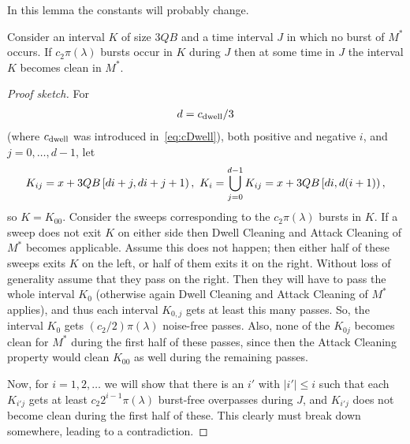 \documentclass[12pt]{memoir}
\renewcommand{\le}{\leq}
\def\B{B}
\newcommand{\Q}{Q}
\newcommand{\Cns}[2]{#1_{\textrm{\upshape #2}}}
\newcommand{\cns}[1]{\Cns{c}{#1}}
\newcommand{\cDwell}{\cns{dwell}}
\begin{document}
In this lemma the constants will probably change.
\begin{lemma}\label{lem:burst-density}
  Consider an interval \( K \) of size \( 3 \Q\B \) and a time interval \( J \) in which
no burst of \( M^{*} \) occurs.
If \( c_{2}\pi(\lambda) \) bursts occur in \( K \) during \( J \) then at some time in \( J \)
the interval \( K \) becomes clean in \( M^{*} \).
\end{lemma}
\begin{proof}[Proof sketch]
For 
\begin{align*}
 d=\cDwell/3
\end{align*}
(where \( \cDwell \) was introduced in~\eqref{eq:cDwell}),
both positive and negative \( i \), and \( j=0,\dots,d-1 \), let
\begin{align*}
   K_{ij}=x+3\Q\B\lint{d i+j}{d i+j+1},\ 
K_{i}=\bigcup_{j=0}^{d-1}K_{ij}=x+3\Q\B\lint{di}{d(i+1)},
 \end{align*}
so \( K=K_{00} \).
Consider the sweeps corresponding to the \( c_{2}\pi(\lambda) \) bursts in \( K \).
If a sweep does not exit \( K \) on either side then Dwell Cleaning and Attack Cleaning
of \( M^{*} \) becomes applicable.
Assume this does not happen; then
either half of these sweeps exits \( K \) on the left, or half of them exits it on the right.
Without loss of generality assume that they pass on the right.
Then they will have to pass the whole interval \( K_{0} \) (otherwise again Dwell Cleaning
and Attack Cleaning of \( M^{*} \)
applies), and thus each interval \( K_{0,j} \) gets at least this many passes.
So, the interval \( K_{0} \) gets \( (c_{2}/2)\pi(\lambda) \) noise-free passes.
Also, none of the \( K_{0j} \) becomes clean for \( M^{*} \) during the first half of these passes,
since then the Attack Cleaning property would clean \( K_{00} \) as well during the remaining
passes.

Now, for \( i=1,2,\dots \) we will show that there is 
an \( i'  \) with \( |i'|\le i \) such that each \( K_{i'j} \)
gets at least \( c_{2} 2^{i-1}\pi(\lambda) \) burst-free overpasses  during \( J \), 
and \( K_{i'j} \) does not become clean during the first half of these.
This clearly must break down somewhere, leading to a contradiction.


\end{proof}
\end{document}
